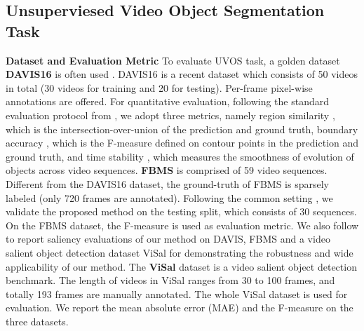 \documentclass[runningheads]{llncs}
\begin{document}
\subsection{Unsuperviesed Video Object Segmentation Task}\label{exp_uvos}
\textbf{Dataset and Evaluation Metric} To evaluate UVOS task, a golden dataset \textbf{DAVIS16} is often used  \cite{vos_cosnet,vos_agnn,vos_ags,vos_lsmo,vos_pdb}. DAVIS16 is a recent dataset which consists of 50 videos in total (30 videos for training and 20 for testing). Per-frame pixel-wise annotations are offered. For quantitative evaluation, following the standard evaluation protocol from \cite{davis_16}, we adopt three metrics, namely region similarity , which is the intersection-over-union of the prediction and ground truth, boundary accuracy , which is the F-measure defined on contour points in the prediction and ground truth, and time stability , which measures the smoothness of evolution of objects across video sequences. \textbf{FBMS} \cite{fbms} is comprised of 59 video sequences. Different from the DAVIS16 dataset, the ground-truth of FBMS is sparsely labeled (only 720 frames are annotated). Following the common setting \cite{vos_pdb,vos_andiff,motadapt}, we validate the proposed method on the testing split, which consists of 30 sequences. On the FBMS dataset, the F-measure is used as evaluation metric.  We also follow  \cite{vos_pdb,vos_andiff} to report saliency evaluations of our method on DAVIS, FBMS and a video salient object detection dataset ViSal \cite{video_gafl} for demonstrating the robustness and wide applicability of our method.  The \textbf{ViSal} \cite{video_gafl} dataset is a video salient object detection benchmark. The length of videos in ViSal ranges from 30 to 100 frames, and totally 193 frames are manually annotated. The whole ViSal dataset is used for evaluation. We report the mean absolute error (MAE) and the F-measure on the three datasets. \\
\end{document}
